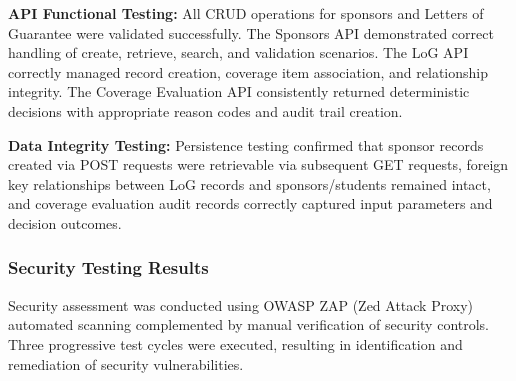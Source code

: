 \textbf{API Functional Testing:} All CRUD operations for sponsors and Letters of Guarantee were validated successfully. The Sponsors API demonstrated correct handling of create, retrieve, search, and validation scenarios. The LoG API correctly managed record creation, coverage item association, and relationship integrity. The Coverage Evaluation API consistently returned deterministic decisions with appropriate reason codes and audit trail creation.

\textbf{Data Integrity Testing:} Persistence testing confirmed that sponsor records created via POST requests were retrievable via subsequent GET requests, foreign key relationships between LoG records and sponsors/students remained intact, and coverage evaluation audit records correctly captured input parameters and decision outcomes.

\subsubsection{Security Testing Results}

Security assessment was conducted using OWASP ZAP (Zed Attack Proxy) automated scanning complemented by manual verification of security controls. Three progressive test cycles were executed, resulting in identification and remediation of security vulnerabilities.

